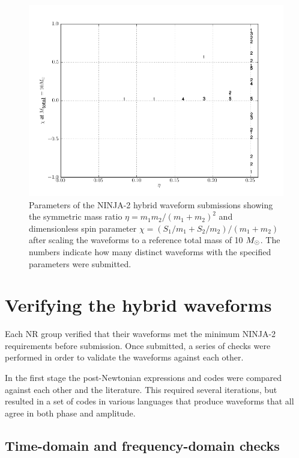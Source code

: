 \begin{figure}
  \includegraphics[width=\linewidth]{figures/ninja2/ninja2_cat.png}
  \caption[Parameters of the NINJA-2 submissions]{
  \label{f:ninja2_param_map}
Parameters of the NINJA-2 hybrid waveform submissions showing the
symmetric mass ratio $\eta=m_1 m_2 /(m_1+m_2)^2$ and dimensionless
spin parameter $\chi=(S_1/m_1 + S_2/m_2)/(m_1+m_2)$ after scaling the
waveforms to a reference total mass of 10 $M_\odot$.  The numbers indicate 
how many distinct waveforms with the specified parameters were submitted.}
\end{figure}%

\section{Verifying the hybrid waveforms}

Each NR group verified that their waveforms met the minimum NINJA-2
requirements before submission.  Once submitted, a series of checks
were performed in order to validate the waveforms against each other.

In the first stage the post-Newtonian expressions and codes were
compared against each other and the literature.  This required several
iterations, but resulted in a set of codes in various languages that
produce waveforms that all agree in both phase and amplitude. 

\subsection{Time-domain and frequency-domain checks}

